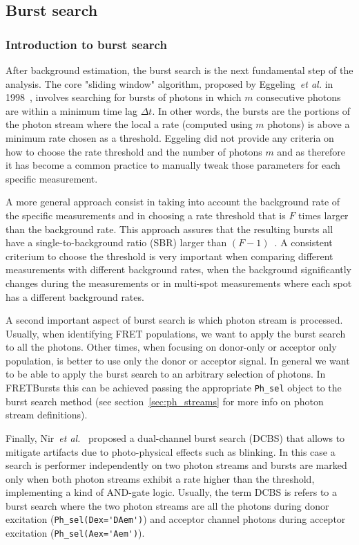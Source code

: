 \subsection{Burst search}
\label{sec:burstsearch}

\subsubsection{Introduction to burst search}
\label{sec:burstsearch_intro}

After background estimation, the burst search is the next fundamental step of the analysis. The core "sliding window" algorithm, proposed by Eggeling~\textit{et al.} in 1998~\cite{Eggeling_1998}, involves searching for bursts of photons
in which $m$ consecutive photons are within a minimum time lag $\Delta t$. In other words, the bursts are the portions of the photon stream where the local a rate (computed using $m$ photons) is above a minimum rate chosen as a threshold. Eggeling did not provide any criteria on how to choose the rate threshold and the number of photons $m$ and as therefore it has become a common practice to manually tweak those parameters for each specific measurement. 

A more general approach consist in taking into account the background rate of the specific measurements and in choosing a rate threshold that is $F$ times larger than the background rate. This approach assures that the resulting bursts all have a single-to-background ratio (SBR) larger than $(F-1)$~\cite{Michalet_2012}. A consistent criterium to choose the threshold is very important when comparing different measurements with different background rates, when the background significantly changes during the measurements or in multi-spot measurements where each spot has a different background rates.

A second important aspect of burst search is which photon stream is processed. Usually, when identifying FRET populations, we want to apply the burst search to all the photons. Other times, when focusing on donor-only or acceptor only population, is better to use only the donor or acceptor signal. In general we want to be able to apply the burst search to an arbitrary selection of photons. In FRETBursts this can be achieved passing the appropriate \verb|Ph_sel| object to the burst search method (see section~\ref{sec:ph_streams} for more info on photon stream definitions).

Finally, Nir~\textit{et al.}~\cite{Nir_2006} proposed a dual-channel burst search (DCBS) that allows to mitigate artifacts due to photo-physical effects such as blinking. In this case a search is performer independently on two photon streams and bursts are marked only when both photon streams exhibit a rate higher than the threshold, 
implementing a kind of AND-gate logic. 
Usually, the term DCBS is refers to a burst search where the two photon streams are all the photons 
during donor excitation (\verb|Ph_sel(Dex='DAem')|) and acceptor channel photons during acceptor 
excitation (\verb|Ph_sel(Aex='Aem')|).

